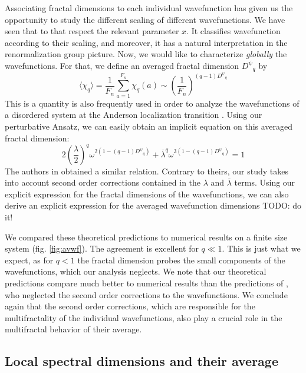 \documentclass[aps,prl,preprint]{revtex4-1}
\newcommand{\lb}{\ensuremath{\overline{\lambda}}}
\newcommand{\avwf}{\ensuremath{D^\psi}}
\begin{document}
Associating fractal dimensions to each individual wavefunction has given us the opportunity to study the different scaling of different wavefunctions. We have seen that to that respect the relevant parameter $x$. It classifies wavefunction according to their scaling, and moreover, it has a natural interpretation in the renormalization group picture.
Now, we would like to characterize \emph{globally} the wavefunctions. For that, we define an averaged fractal dimension $\avwf_q$ by
\begin{equation}
	\langle \chi_q \rangle = \frac{1}{F_n} \sum_{a=1}^{F_n} \chi_q(a) \sim \left( \frac{1}{F_n} \right)^{(q-1)\avwf_q}
\end{equation}
This is a quantity is also frequently used in order to analyze the wavefunctions of a disordered system at the Anderson localization transition \cite{Mirlin2006}.
Using our perturbative Ansatz, we can easily obtain an implicit equation on this averaged fractal dimension:
\begin{equation}
	\label{eq:avwf}
	2\left( \frac{\lambda}{2}\right)^q \omega^{2(1-(q-1)\avwf_q)} + \lb^q \omega^{3(1-(q-1)\avwf_q)} = 1
\end{equation}
The authors in \cite{Thiem2013} obtained a similar relation. Contrary to theirs, our study takes into account second order corrections contained in the $\lambda$ and $\lb$ terms.
Using our explicit expression for the fractal dimensions of the wavefunctions, we can also derive an explicit expression for the averaged wavefunction dimensions {\color{red} TODO: do it!}

We compared these theoretical predictions to numerical results on a finite size system (fig. \eqref{fig:avwf}). The agreement is excellent for $q \ll 1$. This is just what we expect, as for $q < 1$ the fractal dimension probes the small components of the wavefunctions, which our analysis neglects. 
We note that our theoretical predictions compare much better to numerical results than the predictions of \cite{Thiem2013}, who neglected the second order corrections to the wavefunctions. We conclude again that the second order corrections, which are responsible for the multifractality of the individual wavefunctions, also play a crucial role in the multifractal behavior of their average.

\subsection{Local spectral dimensions and their average}
\end{document}
